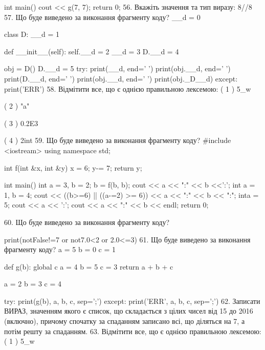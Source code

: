 \documentclass[11pt]{article}
\begin{document}
int main(){
    cout << g(7, 7);
    return 0;
}
\vspace{5mm}
56. 
Вкажіть значення та тип виразу:
8//8%
\vspace{5mm}
57. Що буде виведено за виконання фрагменту коду?
__d = 0

class D:
    __d = 1
    
    def __init__(self):
        self.__d = 2
        __d = 3
        D.__d = 4

obj = D()
D.__d = 5
try:
    print(__d, end=' ')
    print(obj.__d, end=' ')
    print(D.__d, end=' ')
    print(obj.__d, end=' ')
    print(obj._D__d)
except:
    print('ERR')
\vspace{5mm}
58. %
Відмітити все, що є однією правильною лексемою:
( 1 ) 5_w

( 2 ) "a\na"

( 3 ) 0.2E3

( 4 ) 2int
\vspace{5mm}
59. Що буде виведено за виконання фрагменту коду?
#include <iostream>
using namespace std;

int f(int &x, int &y){
    x = 6;
    y-= 7;
    return y;
}

int main(){
    int a = 3, b = 2;
    b = f(b, b);
    cout << a << ":" << b <<':';
    {
        int a = 1, b = 4;
        cout << ((b>=6) || ((a-=2) >= 6))
             << a << ":" << b << ":";
    }
    {
        inta = 5;
        cout << a << ':';
    }
    cout << a << ":" << b << endl;
    return 0;
}

\vspace{5mm}
60. Що буде виведено за виконання фрагменту коду?

print(notFalse!=7 or not7.0<2 or 2.0<=3)
\vspace{5mm}
61. Що буде виведено за виконання фрагменту коду?
a = 5
b = 0
c = 1

def g(b):
global c    a = 4
    b = 5
    c = 3
    return a + b + c

a = 2
b = 3
c = 4

try:
    print(g(b), a, b, c, sep=';')
except:
    print('ERR', a, b, c, sep=';')
\vspace{5mm}
62. 
Записати ВИРАЗ, значенням якого є список, що складається з цілих чисел від 15 до 2016 (включно), причому спочатку за спаданням записано всі, що діляться на 7, а потім решту за спаданням.\vspace{5mm}
63. %
Відмітити все, що є однією правильною лексемою:
( 1 ) 5_w
\end{document}
